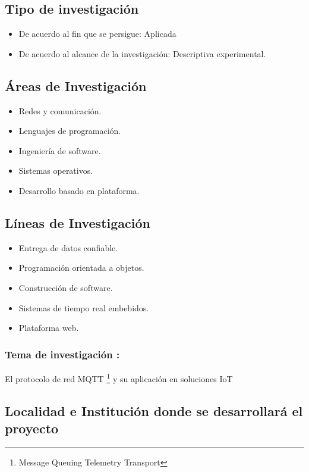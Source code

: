\documentclass[a4paper, 12pt]{article}
\begin{document}
\subsection{Tipo de investigación}

\begin{itemize}
\item De acuerdo al fin que se persigue: Aplicada 
\item De acuerdo al alcance de  la investigación: Descriptiva experimental.
\end{itemize}



\subsection{Áreas de Investigación}
\begin{itemize}
\item Redes y comunicación.
\item Lenguajes de programación.
\item Ingeniería de software.
\item Sistemas operativos.
\item Desarrollo basado en plataforma.
\end{itemize}
\subsection{Líneas de Investigación}
\begin{itemize}
\item Entrega de datos confiable.
\item Programación orientada a objetos.
\item Construcción de software.
\item Sistemas de tiempo real embebidos.
\item Plataforma web.

\end{itemize}

               
\subsubsection{Tema de investigación :} 

El protocolo de red MQTT \footnote{Message Queuing Telemetry Transport} y su aplicación en soluciones IoT

\subsection{Localidad e Institución donde se desarrollará el proyecto }
\end{document}
